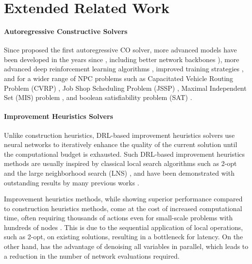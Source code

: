 \section{Extended Related Work} \label{app:related_work}

\paragraph{Autoregressive Constructive Solvers}

Since \citet{bello2016neural} proposed the first autoregressive CO solver, more advanced models have been developed in the years since \citep{ean, 19iclr-am, peng2019deep, drori2020learning, kwon2021matrix}, including better network backbones \citep{vaswani2017attention,19iclr-am,bresson2018experimental}), more advanced deep reinforcement learning algorithms \citep{khalil2017learning,ma2019combinatorial,kool2019buy,kwon2020pomo,ouyang2021improving,xin2021multi,wang2021game,choo2022simulationguided}, improved training strategies \citep{kim2022symnco,bilearning}, and for a wider range of NPC
problems such as Capacitated Vehicle Routing Problem (CVRP) \citep{nazari2018reinforcement}, Job Shop Scheduling Problem (JSSP) \citep{zhang2020learning,park2021learning}, Maximal Independent Set (MIS) problem \citep{khalil2017learning,ahn2020learning,malherbe2022optimistic,qiudimes}, and boolean satisfiability problem (SAT) \citep{yolcu2019learning}.


\paragraph{Improvement Heuristics Solvers}

Unlike construction heuristics, DRL-based improvement heuristics solvers use neural networks to iteratively enhance the quality of the current solution until the computational budget is exhausted. Such DRL-based improvement heuristics methods are usually inspired by classical local search algorithms such as 2-opt \citep{croes1958method} and the large neighborhood search (LNS) \citep{shaw1997new}, and have been demonstrated with outstanding results by many previous works \citep{chen2019learning,hottung2019neural,da2020learning,d2020learning,xin2021neurolkh,ma2021learning,wu2021learning,l2i,wang2021bi,kim2021learning,hudson2022graph}.


Improvement heuristics methods, while showing superior performance compared to construction heuristics methods, come at the cost of increased computational time, often requiring thousands of actions even for small-scale problems with hundreds of nodes \citep{d2020learning,wang2021bi}. This is due to the sequential application of local operations, such as 2-opt, on existing solutions, resulting in a bottleneck for latency. On the other hand, \method{} has the advantage of denoising all variables in parallel, which leads to a reduction in the number of network evaluations required.



